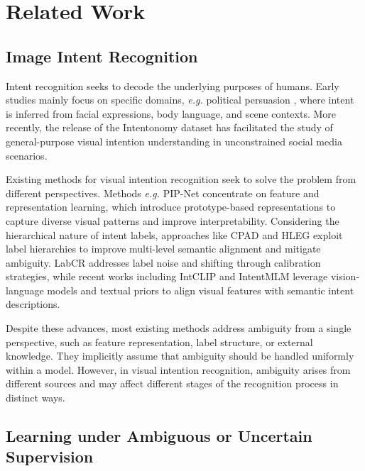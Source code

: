 \section{Related Work}
\label{sec:related_work}

\subsection{Image Intent Recognition}
Intent recognition seeks to decode the underlying purposes of humans. 
Early studies mainly focus on specific domains, \textit{e.g.} political persuasion \cite{joo_visual_2014, joo_automated_2015, huang_inferring_2016}, where intent is inferred from facial expressions, body language, and scene contexts. 
More recently, the release of the Intentonomy dataset \cite{jia_intentonomy_2021} has facilitated the study of general-purpose visual intention understanding in unconstrained social media scenarios.

Existing methods for visual intention recognition seek to solve the problem from different perspectives. 
Methods \textit{e.g.} PIP-Net \cite{wang_prototype-based_2023} concentrate on feature and representation learning, which introduce prototype-based representations to capture diverse visual patterns and improve interpretability. 
Considering the hierarchical nature of intent labels, approaches like CPAD \cite{ye_cross-modality_2023} and HLEG \cite{shi_learnable_2023} exploit label hierarchies to improve multi-level semantic alignment and mitigate ambiguity.  
LabCR \cite{shi_label-aware_2024} addresses label noise and shifting through calibration strategies, while recent works including IntCLIP \cite{leonardis_synergy_2025} and IntentMLM \cite{wang_unlocking_2026} leverage vision-language models and textual priors to align visual features with semantic intent descriptions.

Despite these advances, most existing methods address ambiguity from a single perspective, such as feature representation, label structure, or external knowledge. 
They implicitly assume that ambiguity should be handled uniformly within a model. 
However, in visual intention recognition, ambiguity arises from different sources and may affect different stages of the recognition process in distinct ways.

\subsection{Learning under Ambiguous or Uncertain Supervision}

